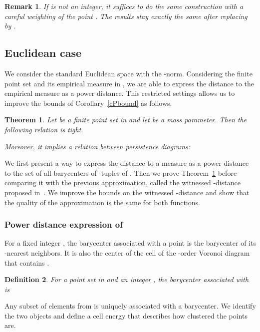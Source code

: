 \documentclass[a4paper]{article}
\newtheorem{theorem}{Theorem}[section]
\newtheorem{definition}[theorem]{Definition}
\newtheorem{remark}{Remark}
\begin{document}
\begin{remark}\label{rkNotInteger}
If  is not an integer, it suffices to do the same construction with a careful weighting of the point .
The results stay exactly the same after replacing  by .
\end{remark}

\subsection{Euclidean case}\label{ssEc}

We consider the standard Euclidean space  with the -norm.
Considering the finite point set  and its empirical measure in , we are able to express the distance to the empirical measure  as a power distance. 
This restricted settings allows us to improve the bounds of Corollary~\ref{cPbound} as follows.
\begin{theorem}\label{tPboundEuc}
Let  be a finite point set in  and let  be a mass parameter.
Then the following relation is tight.

Moreover, it implies a relation between persistence diagrams:

\end{theorem}

We first present a way to express the distance to a measure as a power distance to the set of all barycenters of -tuples of .
Then we prove Theorem~\ref{tPboundEuc} before comparing it with the previous approximation, called the witnessed -distance proposed in~\cite{wkdGMM}.
We improve the bounds on the witnessed -distance and show that the quality of the approximation is the same for both functions.

\subsubsection{Power distance expression of }
For a fixed integer , the barycenter associated with a point  is the barycenter of its -nearest neighbors.
It is also the center of the cell of the -order Voronoi diagram that contains .

\begin{definition}
For a point set  in  and an integer , the \emph{barycenter associated with } is

\end{definition}

Any subset of  elements from  is uniquely associated with a barycenter. 
We identify the two objects and define a cell energy that describes how clustered the points are.
\end{document}
